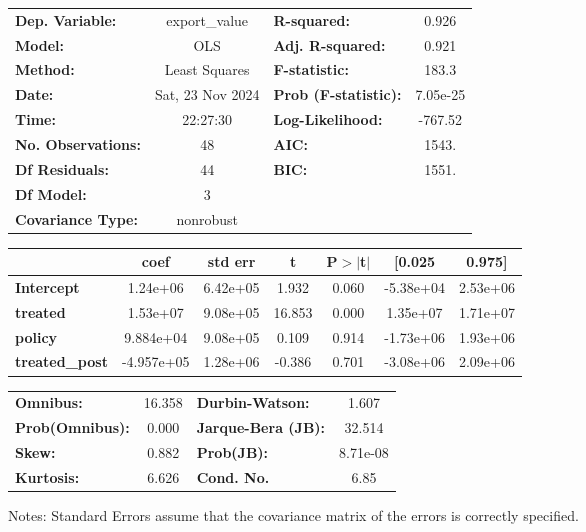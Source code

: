 \begin{center}
\begin{tabular}{lclc}
\toprule
\textbf{Dep. Variable:}    &  export\_value   & \textbf{  R-squared:         } &     0.926   \\
\textbf{Model:}            &       OLS        & \textbf{  Adj. R-squared:    } &     0.921   \\
\textbf{Method:}           &  Least Squares   & \textbf{  F-statistic:       } &     183.3   \\
\textbf{Date:}             & Sat, 23 Nov 2024 & \textbf{  Prob (F-statistic):} &  7.05e-25   \\
\textbf{Time:}             &     22:27:30     & \textbf{  Log-Likelihood:    } &   -767.52   \\
\textbf{No. Observations:} &          48      & \textbf{  AIC:               } &     1543.   \\
\textbf{Df Residuals:}     &          44      & \textbf{  BIC:               } &     1551.   \\
\textbf{Df Model:}         &           3      & \textbf{                     } &             \\
\textbf{Covariance Type:}  &    nonrobust     & \textbf{                     } &             \\
\bottomrule
\end{tabular}
\begin{tabular}{lcccccc}
                       & \textbf{coef} & \textbf{std err} & \textbf{t} & \textbf{P$> |$t$|$} & \textbf{[0.025} & \textbf{0.975]}  \\
\midrule
\textbf{Intercept}     &     1.24e+06  &     6.42e+05     &     1.932  &         0.060        &    -5.38e+04    &     2.53e+06     \\
\textbf{treated}       &     1.53e+07  &     9.08e+05     &    16.853  &         0.000        &     1.35e+07    &     1.71e+07     \\
\textbf{policy}        &    9.884e+04  &     9.08e+05     &     0.109  &         0.914        &    -1.73e+06    &     1.93e+06     \\
\textbf{treated\_post} &   -4.957e+05  &     1.28e+06     &    -0.386  &         0.701        &    -3.08e+06    &     2.09e+06     \\
\bottomrule
\end{tabular}
\begin{tabular}{lclc}
\textbf{Omnibus:}       & 16.358 & \textbf{  Durbin-Watson:     } &    1.607  \\
\textbf{Prob(Omnibus):} &  0.000 & \textbf{  Jarque-Bera (JB):  } &   32.514  \\
\textbf{Skew:}          &  0.882 & \textbf{  Prob(JB):          } & 8.71e-08  \\
\textbf{Kurtosis:}      &  6.626 & \textbf{  Cond. No.          } &     6.85  \\
\bottomrule
\end{tabular}
\end{center}

Notes: \newline
 [1] Standard Errors assume that the covariance matrix of the errors is correctly specified.